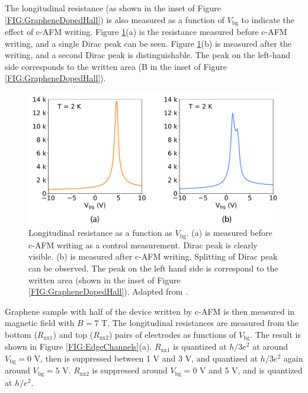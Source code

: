 \documentclass[pdflatex, sectionletters, 12pt, final, phd]{pittetd}    %
\begin{document}
The longitudinal resistance (as shown in the inset of Figure \ref{FIG:GrapheneDopedHall}) is also measured as a function of $V_\mathrm{bg}$ to indicate the effect of c-AFM writing. Figure \ref{FIG:DiracPointSplit}(a) is the resistance measured before c-AFM writing, and a single Dirac peak can be seen. Figure \ref{FIG:DiracPointSplit}(b) is measured after the writing, and a second Dirac peak is distinguishable. The peak on the left-hand side corresponds to the written area (B in the inset of Figure \ref{FIG:GrapheneDopedHall}).

\begin{figure}[h!]
	\centering
	\includegraphics[width=.75\textwidth]{Drawing/DiracPointSplit.pdf}
	\caption[Longitudinal resistance as a function as $V_\mathrm{bg}$]{Longitudinal resistance as a function as $V_\mathrm{bg}$. (a) is measured before c-AFM writing as a control measurement. Dirac peak is clearly visible. (b) is measured after c-AFM writing. Splitting of Dirac peak can be observed. The peak on the left hand side is correspond to the written area (shown in the inset of Figure \ref{FIG:GrapheneDopedHall}). Adapted from \cite{li2019reconfigurable}.}
	\label{FIG:DiracPointSplit}
\end{figure}

Graphene sample with half of the device written by c-AFM is then measured in magnetic field with $B = 7$ T. The longitudinal resistances are measured from the bottom ($R_\mathrm{xx1}$) and top ($R_\mathrm{xx2}$) pairs of electrodes as functions of $V_\mathrm{bg}$. The result is shown in Figure \ref{FIG:EdgeChannels}(a). $R_\mathrm{xx1}$ is quantized at $h/3e^2$ at around $V_\mathrm{bg} = 0$ V, then is suppressed between 1 V and 3 V, and quantized at $h/3e^2$ again around $V_\mathrm{bg} = 5$ V. $R_\mathrm{xx2}$ is suppressed around $V_\mathrm{bg} = 0$ V and 5 V, and is quantized at $h/e^2$. 
\end{document}

